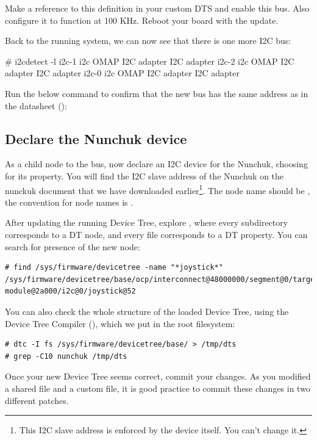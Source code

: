 Make a reference to this definition in your custom DTS and enable this
bus. Also configure it to function at 100 KHz. Reboot your board with
the update.

Back to the running system, we can now see that there is one more
I2C bus:

\begin{bashinput}
# i2cdetect -l
i2c-1	i2c             OMAP I2C adapter                        I2C adapter
i2c-2	i2c             OMAP I2C adapter                        I2C adapter
i2c-0	i2c             OMAP I2C adapter                        I2C adapter
\end{bashinput}

Run the below command to confirm that the new bus has the same address
as in the datasheet ():


\subsection{Declare the Nunchuk device}

As a child node to the  bus, now declare an I2C device
for the Nunchuk, choosing  for its 
property. You will find the I2C slave address of the Nunchuk on the
nunckuk document that we have downloaded earlier\footnote{This I2C slave
address is enforced by the device itself. You can't change it.}.
The node name should be , the convention for node
names is .

After updating the running Device Tree, explore
, where every subdirectory corresponds to
a DT node, and every file corresponds to a DT property. You can search
for presence of the new  node:

{\small
\begin{verbatim}
# find /sys/firmware/devicetree -name "*joystick*"
/sys/firmware/devicetree/base/ocp/interconnect@48000000/segment@0/target-module@2a000/i2c@0/joystick@52
\end{verbatim}
}

You can also check the whole structure of the loaded Device Tree, using
the Device Tree Compiler (), which we put in the root
filesystem:
\begin{verbatim}
# dtc -I fs /sys/firmware/devicetree/base/ > /tmp/dts
# grep -C10 nunchuk /tmp/dts
\end{verbatim}

Once your new Device Tree seems correct, commit your changes. As you
modified a shared file and a custom file, it is good practice to commit
these changes in two different patches.
